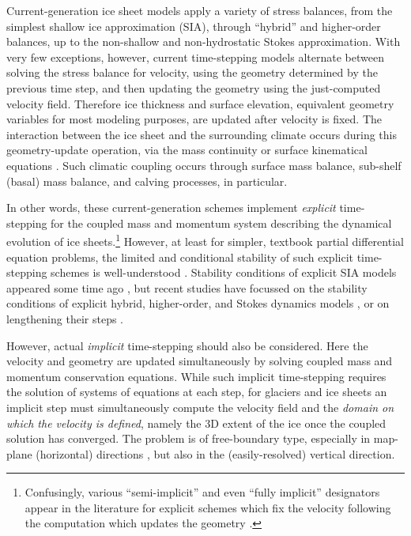 \documentclass[review]{igs}
\begin{document}
Current-generation ice sheet models apply a variety of stress balances, from the simplest shallow ice approximation (SIA), through ``hybrid'' \citep{Robinsonetal2022,Winkelmannetal2011} and higher-order balances, up to the non-shallow and non-hydrostatic Stokes approximation.  With very few exceptions, however, current time-stepping models alternate between solving the stress balance for velocity, using the geometry determined by the previous time step, and then updating the geometry using the just-computed velocity field.  Therefore ice thickness and surface elevation, equivalent geometry variables for most modeling purposes, are updated after velocity is fixed.  The interaction between the ice sheet and the surrounding climate occurs during this geometry-update operation, via the mass continuity or surface kinematical equations \citep{GreveBlatter2009}.  Such climatic coupling occurs through surface mass balance, sub-shelf (basal) mass balance, and calving processes, in particular.

In other words, these current-generation schemes implement \emph{explicit} time-stepping for the coupled mass and momentum system describing the dynamical evolution of ice sheets.\footnote{Confusingly, various ``semi-implicit'' and even ``fully implicit'' designators appear in the literature for explicit schemes which fix the velocity following the computation which updates the geometry \citep[for example]{Chengetal2017}.}  However, at least for simpler, textbook partial differential equation problems, the limited and conditional stability of such explicit time-stepping schemes is well-understood \citep{LeVeque2007}.  Stability conditions of explicit SIA models appeared some time ago \citep[e.g.][]{HindmarshPayne1996}, but recent studies have focussed on the stability conditions of explicit hybrid, higher-order, and Stokes dynamics models \citep{Chengetal2017,Robinsonetal2022}, or on lengthening their steps \citep{LofgrenAhlkronaHelanow2022}.

However, actual \emph{implicit} time-stepping \citep{LeVeque2007} should also be considered.  Here the velocity and geometry are updated simultaneously by solving coupled mass and momentum conservation equations.  While such implicit time-stepping requires the solution of systems of equations at each step, for glaciers and ice sheets an implicit step must simultaneously compute the velocity field and the \emph{domain on which the velocity is defined}, namely the 3D extent of the ice once the coupled solution has converged.  The problem is of free-boundary type, especially in map-plane (horizontal) directions \citep{SchoofHewitt2013}, but also in the (easily-resolved) vertical direction.
\end{document}

